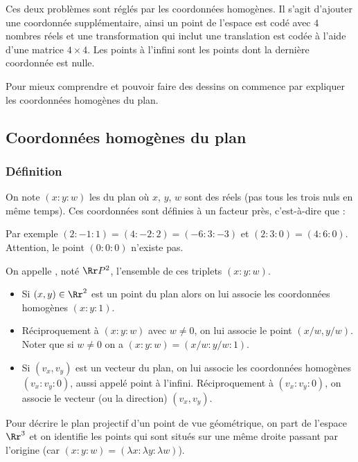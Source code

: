 \documentclass[11pt,class=report,crop=false]{standalone}
\begin{document}
Ces deux problèmes sont réglés par les coordonnées homogènes. Il s'agit d'ajouter une coordonnée supplémentaire, ainsi un point de l'espace est codé avec $4$ nombres réels et une transformation qui inclut une translation est codée à l'aide d'une matrice $4 \times 4$. Les points à l'infini sont les points dont la dernière coordonnée est nulle.

Pour mieux comprendre et pouvoir faire des dessins on commence par expliquer les coordonnées homogènes du plan.


\subsection{Coordonnées homogènes du plan}

\subsubsection{Définition}

On note $(x:y:w)$ les  du plan où $x$, $y$, $w$ sont des réels (pas tous les trois nuls en même temps).
Ces coordonnées sont définies à un facteur près, c'est-à-dire que :

Par exemple $(2:-1:1) = (4:-2:2) = (-6:3:-3)$ et $(2:3:0) = (4:6:0)$. Attention, le point \og{}$(0:0:0)$\fg{} n'existe pas.

On appelle , noté $\Rr P^2$, l'ensemble de ces triplets $(x:y:w)$.

\begin{itemize}
  \item Si $(x,y) \in \Rr^2$ est un point du plan alors on lui associe les coordonnées homogènes $(x:y:1)$.
  
  \item Réciproquement à $(x:y:w)$ avec $w\neq 0$, on lui associe le point $(x/w,y/w)$. Noter que si $w\neq 0$ on a $(x:y:w) = (x/w:y/w:1)$.

  \item Si $(v_x,v_y)$ est un vecteur du plan, on lui associe les coordonnées homogènes $(v_x:v_y:0)$, aussi appelé \og{}point à l'infini\fg{}.
  Réciproquement à $(v_x:v_y:0)$, on associe le vecteur (ou la direction) $(v_x,v_y)$.
\end{itemize}


Pour décrire le plan projectif d'un point de vue géométrique, on part de l'espace $\Rr^3$ et on identifie les points qui sont situés sur une même droite passant par l'origine (car $(x:y:w) = (\lambda x : \lambda y : \lambda w)$).
\end{document}
